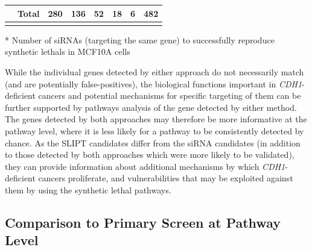 \begin{table}[!ht]
\begin{center}
{\begin{threeparttable}
\begin{tabular}{>{\cellcolor{white}}rrcccccl}
\rowcolor{black!5}
\cellcolor{white}                                                           & \multicolumn{1}{r|}{\cellcolor{white} \bfseries Total}            & \multicolumn{1}{c}{280} & \multicolumn{1}{c}{136} & \multicolumn{1}{c}{52} & \multicolumn{1}{c}{18} & \multicolumn{1}{c|}{6}   & \multicolumn{1}{l|}{482}                  \\ \cline{3-8} 
\end{tabular} 
\begin{tablenotes}
\raggedright \small
\item[*] Number of \glspl{siRNA} (targeting the same gene) to successfully reproduce \glspl{synthetic lethal} in MCF10A cells \citep{Telford2015}

\end{tablenotes}
\end{threeparttable}
}
\end{center}
\end{table}

While the individual genes detected by either approach do not necessarily match (and are potentially false-positives), the biological functions important in \textit{CDH1}-deficient cancers and potential mechanisms for specific targeting of them can be further supported by \glspl{pathway} analysis of the gene detected by either method. The genes detected by both approaches may therefore be more informative at the \gls{pathway} level, where it is less likely for a \gls{pathway} to be consistently detected by chance. As the \gls{SLIPT} candidates differ from the \gls{siRNA} candidates (in addition to those detected by both approaches which were more likely to be validated), they can provide information about additional mechanisms by which \textit{CDH1}-deficient cancers proliferate, and vulnerabilities that may be exploited against them by using the \gls{synthetic lethal} \glspl{pathway}.

\FloatBarrier

\subsection{Comparison to Primary Screen at Pathway Level}  \label{chapt3:compare_pathway}

